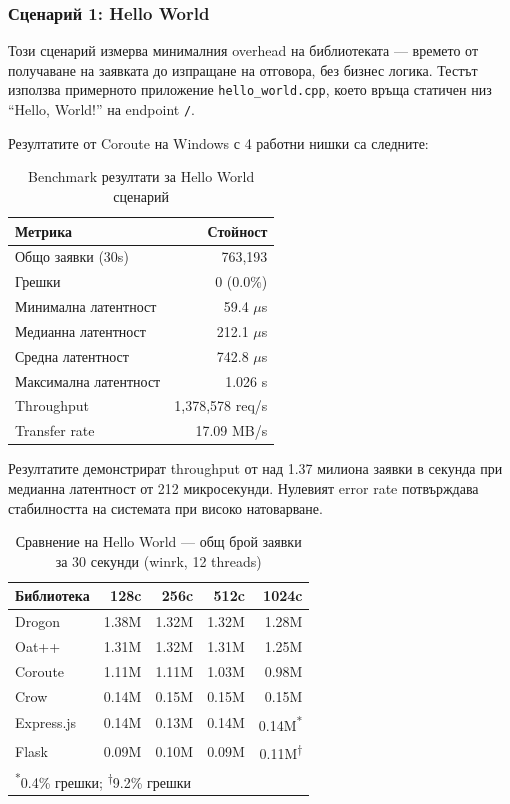 \subsubsection{Сценарий 1: Hello World}

Този сценарий измерва минималния overhead на библиотеката --- времето от получаване на заявката до изпращане на отговора, без бизнес логика. Тестът използва примерното приложение \texttt{hello\_world.cpp}, което връща статичен низ ``Hello, World!'' на endpoint \texttt{/}.

Резултатите от Coroute на Windows с 4 работни нишки са следните:

\begin{table}[H]
\centering
\caption{Benchmark резултати за Hello World сценарий}
\label{tab:hello_world_benchmark}
\begin{tabular}{|l|r|}
\hline
\textbf{Метрика} & \textbf{Стойност} \\
\hline
Общо заявки (30s) & 763,193 \\
Грешки & 0 (0.0\%) \\
Минимална латентност & 59.4 $\mu$s \\
Медианна латентност & 212.1 $\mu$s \\
Средна латентност & 742.8 $\mu$s \\
Максимална латентност & 1.026 s \\
Throughput & 1,378,578 req/s \\
Transfer rate & 17.09 MB/s \\
\hline
\end{tabular}
\end{table}

Резултатите демонстрират throughput от над 1.37 милиона заявки в секунда при медианна латентност от 212 микросекунди. Нулевият error rate потвърждава стабилността на системата при високо натоварване.

\begin{table}[H]
\centering
\caption{Сравнение на Hello World --- общ брой заявки за 30 секунди (winrk, 12 threads)}
\label{tab:hello_world_comparison}
\begin{tabular}{|l|r|r|r|r|}
\hline
\textbf{Библиотека} & \textbf{128c} & \textbf{256c} & \textbf{512c} & \textbf{1024c} \\
\hline
Drogon & 1.38M & 1.32M & 1.32M & 1.28M \\
Oat++ & 1.31M & 1.32M & 1.31M & 1.25M \\
Coroute & 1.11M & 1.11M & 1.03M & 0.98M \\
Crow & 0.14M & 0.15M & 0.15M & 0.15M \\
Express.js & 0.14M & 0.13M & 0.14M & 0.14M\textsuperscript{*} \\
Flask & 0.09M & 0.10M & 0.09M & 0.11M\textsuperscript{†} \\
\hline
\multicolumn{5}{l}{\rule{0pt}{3ex}\textsuperscript{*}\footnotesize 0.4\% грешки; \textsuperscript{†}\footnotesize 9.2\% грешки} \\
\end{tabular}
\end{table}

